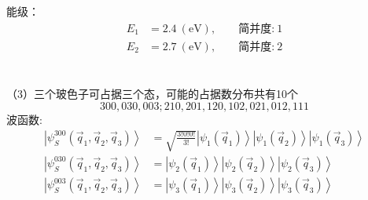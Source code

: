 \begin{frame}[label=current]
  \frametitle{}
能级：
$$ \begin{aligned} E_1&= 2.4~ (\text{eV}), \qquad \text{简并度:} ~1  \\ 
  E_2&= 2.7~ (\text{eV}), \qquad \text{简并度:} ~2  \\
\end{aligned} $$

~~\\ 
（3）三个玻色子可占据三个态，可能的占据数分布共有10个
$$300, 030, 003; 210, 201, 120, 102, 021,  012, 111 $$
波函数:
\[\begin{aligned}
  \left\vert \psi ^{300}_S(\vec{q}_1,\vec{q}_2,\vec{q}_3) \right\rangle 
  &= \sqrt{\frac{3!0!0!}{3!}} \left\vert \psi _1(\vec{q}_1)\right\rangle \left\vert \psi _1(\vec{q}_2)\right\rangle \left\vert \psi _1(\vec{q}_3)\right\rangle\\ 
  \left\vert \psi ^{030}_S(\vec{q}_1,\vec{q}_2,\vec{q}_3) \right\rangle 
  &= \left\vert \psi _2(\vec{q}_1)\right\rangle \left\vert \psi _2(\vec{q}_2)\right\rangle \left\vert \psi _2(\vec{q}_3)\right\rangle\\ 
  \left\vert \psi ^{003}_S(\vec{q}_1,\vec{q}_2,\vec{q}_3) \right\rangle 
  &=\left\vert \psi _3(\vec{q}_1)\right\rangle \left\vert \psi _3(\vec{q}_2)\right\rangle \left\vert \psi _3(\vec{q}_3)\right\rangle\\ 
\end{aligned} \]
\end{frame} 

